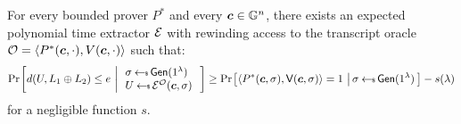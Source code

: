 \begin{lemma}[Soundness]\label{lem:proximity2d_sound}
For every bounded prover $P^\ast$ and every $\bm{c}\in \mathbb{G}^n$, there exists an
expected polynomial time extractor $\mathcal{E}$ with
rewinding access to the transcript oracle $\mathcal{O}=\langle P^\ast(\bm{c},\cdot),V(\bm{c},\cdot)\rangle$
such that:
\begin{align*}
\condprob{
d(U, L_1\oplus L_2) \leq e
}{
\begin{array}{l}
\sigma\sample \gen(\secparam) \\
U\sample \extr^{\mc{O}}(\bm{c},\sigma)
\end{array}}
\geq 
\condprob{\langle P^\ast(\bm{c},\sigma),\verifier(\bm{c},\sigma)\rangle =
1}{\sigma\sample \gen(\secparam)} - s(\secpar)
\end{align*}
for a negligible function $s$.
\end{lemma}
